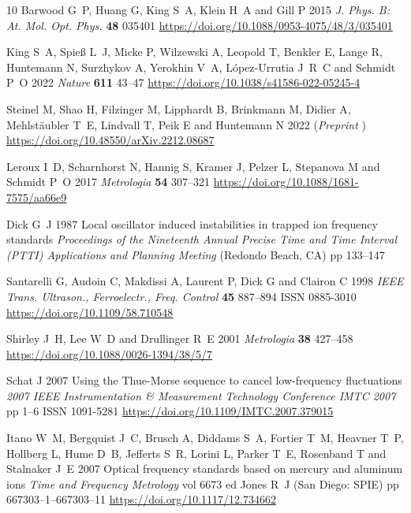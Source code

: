 \documentclass[10pt,a4paper]{iopart}
\begin{document}
\begin{thebibliography}{10}
Barwood G~P, Huang G, King S~A, Klein H~A and Gill P 2015 {\em J. Phys. B: At.
  Mol. Opt. Phys.\/} {\bf 48} 035401
  \urlprefix\url{https://doi.org/10.1088/0953-4075/48/3/035401}

King S~A, Spie{\ss} L~J, Micke P, Wilzewski A, Leopold T, Benkler E, Lange R,
  Huntemann N, Surzhykov A, Yerokhin V~A, L{\'{o}}pez-Urrutia J~R~C and Schmidt
  P~O 2022 {\em Nature\/} {\bf 611} 43--47
  \urlprefix\url{https://doi.org/10.1038/s41586-022-05245-4}

Steinel M, Shao H, Filzinger M, Lipphardt B, Brinkmann M, Didier A,
  Mehlstäubler T~E, Lindvall T, Peik E and Huntemann N 2022
  (\textit{Preprint} )
  \urlprefix\url{https://doi.org/10.48550/arXiv.2212.08687}

Leroux I~D, Scharnhorst N, Hannig S, Kramer J, Pelzer L, Stepanova M and
  Schmidt P~O 2017 {\em Metrologia\/} {\bf 54} 307--321
  \urlprefix\url{https://doi.org/10.1088/1681-7575/aa66e9}

Dick G~J 1987 {L}ocal oscillator induced instabilities in trapped ion frequency
  standards {\em Proceedings of the Nineteenth Annual Precise Time and Time
  Interval (PTTI) Applications and Planning Meeting\/} (Redondo Beach, CA) pp
  133--147

Santarelli G, Audoin C, Makdissi A, Laurent P, Dick G and Clairon C 1998 {\em
  {IEEE} Trans. Ultrason., Ferroelectr., Freq. Control\/} {\bf 45} 887--894
  ISSN 0885-3010 \urlprefix\url{https://doi.org/10.1109/58.710548}

Shirley J~H, Lee W~D and Drullinger R~E 2001 {\em Metrologia\/} {\bf 38}
  427--458 \urlprefix\url{https://doi.org/10.1088/0026-1394/38/5/7}

Schat J 2007 Using the {T}hue-{M}orse sequence to cancel low-frequency
  fluctuations {\em 2007 IEEE Instrumentation \& Measurement Technology
  Conference IMTC 2007\/} pp 1--6 ISSN 1091-5281
  \urlprefix\url{https://doi.org/10.1109/IMTC.2007.379015}

Itano W~M, Bergquist J~C, Brusch A, Diddams S~A, Fortier T~M, Heavner T~P,
  Hollberg L, Hume D~B, Jefferts S~R, Lorini L, Parker T~E, Rosenband T and
  Stalnaker J~E 2007 Optical frequency standards based on mercury and aluminum
  ions {\em Time and Frequency Metrology\/} vol 6673 ed Jones R~J (San Diego:
  {SPIE}) pp {667303--1}--{667303--11}
  \urlprefix\url{https://doi.org/10.1117/12.734662}


\end{thebibliography}
\end{document}
